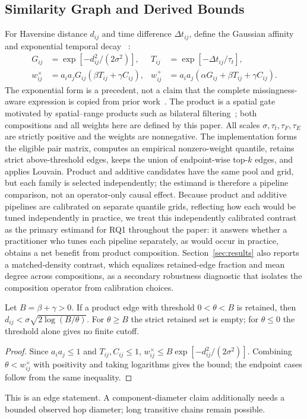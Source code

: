 \documentclass[runningheads]{llncs}
\begin{document}
\subsection{Similarity Graph and Derived Bounds}

For Haversine distance $d_{ij}$ and time difference $\Delta t_{ij}$, define
the Gaussian affinity~\cite{ng2001spectral} and exponential temporal decay
~\cite{zhou2013triggering}:
\begin{align}
G_{ij}&=\exp[-d_{ij}^{2}/(2\sigma^2)],&
T_{ij}&=\exp[-\Delta t_{ij}/\tau_t],\nonumber\\
w^\times_{ij}&=a_i a_jG_{ij}(\beta T_{ij}+\gamma C_{ij}),&
w^+_{ij}&=a_i a_j(\alpha G_{ij}+\beta T_{ij}+\gamma C_{ij}).
\label{eq:similarities}
\end{align}
The exponential form is a precedent, not a claim that the complete
missingness-aware expression is copied from prior work~\cite{billot2008exponential}.
The product is a spatial gate motivated by spatial--range products such as
bilateral filtering~\cite{tomasi1998bilateral}; both compositions and all
weights here are defined by this paper.
All scales $\sigma,\tau_t,\tau_F,\tau_E$ are strictly positive and the
weights are nonnegative. The implementation forms the eligible pair matrix,
computes an empirical nonzero-weight quantile, retains strict
above-threshold edges, keeps the union of endpoint-wise top-$k$ edges, and
applies Louvain. Product
and additive candidates have the same pool and grid, but each family is
selected independently; the estimand is therefore a pipeline comparison, not
an operator-only causal effect. Because product and additive pipelines are
calibrated on separate quantile grids, reflecting how each would be tuned
independently in practice, we treat this independently calibrated contrast
as the primary estimand for RQ1 throughout the paper: it answers whether a
practitioner who tunes each pipeline separately, as would occur in practice,
obtains a net benefit from product composition. Section~\ref{sec:results}
also reports a matched-density contrast, which equalizes retained-edge
fraction and mean degree across compositions, as a secondary robustness
diagnostic that isolates the composition operator from calibration choices.

\begin{theorem}
Let $B=\beta+\gamma>0$. If a product edge with threshold $0<\theta<B$ is
retained, then
$d_{ij}<\sigma\sqrt{2\log(B/\theta)}$. For $\theta\ge B$ the strict retained
set is empty; for $\theta\le0$ the threshold alone gives no finite cutoff.
\end{theorem}
\begin{proof}
Since $a_ia_j\le1$ and $T_{ij},C_{ij}\le1$,
$w^\times_{ij}\le B\exp[-d_{ij}^{2}/(2\sigma^2)]$. Combining
$\theta<w^\times_{ij}$ with positivity and taking logarithms gives the bound;
the endpoint cases follow from the same inequality.
\end{proof}
This is an edge statement. A component-diameter claim additionally needs a
bounded observed hop diameter; long transitive chains remain possible.
\end{document}
